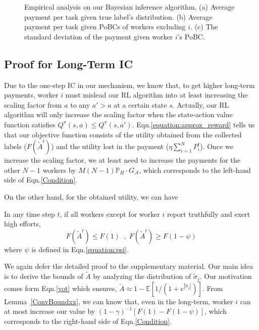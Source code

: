 \begin{figure}[!htb]
\begin{subfigure}[t]{0.32\textwidth}
        \caption{\label{BIM4}}
    \end{subfigure}
    \caption{\label{BIM} Empirical analysis on our Bayesian inference algorithm. (a) Average payment per task given true label's distribution. (b) Average payment per task given PoBCs of workers excluding $i$. (c) The standard deviation of the payment given worker $i$'s PoBC.}
\vspace{-2mm}
\end{figure}
\subsection{Proof for Long-Term IC}
Due to the one-step IC in our mechanism, we know that, to get higher long-term payments, worker $i$ must mislead our RL algorithm into at least increasing the scaling factor from $a$ to any $a'>a$ at a certain state $s$.
Actually, our RL algorithm will only increase the scaling factor when the state-action value function satisfies $Q^{\pi}(s,a)\leq Q^{\pi}(s,a')$.
Eqn.\ref{equation:approx_reward} tells us that our objective function consists of the utility obtained from the collected labels ($F(\tilde{A}^t)$) and the utility lost in the payment ($\eta {\sum}_{i=1}^{N}P^t_i$).
Once we increase the scaling factor, we at least need to increase the payments for the other $N-1$ workers by $M(N-1)\mathbb{P}_H\cdot G_{\mathcal{A}}$, which corresponds to the left-hand side of Eqn.\ref{Condition}.

On the other hand, for the obtained utility, we can have 
\begin{lemma}
\label{ConvBoundxx}
In any time step $t$, if all workers except for worker $i$ report truthfully and exert high efforts,
\begin{equation*}
F(\tilde{A}^t)\leq F(1) \;\;,\; F(\tilde{A}^t)\geq F(1-\psi)
\end{equation*}
where $\psi$ is defined in Eqn.\ref{equation:psi}.
\end{lemma}
We again defer the detailed proof to the supplementary material.
Our main idea is to derive the bounds of $\tilde{A}$ by analyzing the distribution of $\tilde{\sigma}_j$.
Our motivation comes form Eqn.\ref{vot} which ensures, $\tilde{A} \approx 1-\mathbb{E}[1/(1+e^{|\tilde{\sigma}_j|})]$. From Lemma~\ref{ConvBoundxx}, we can know that, even in the long-term, worker $i$ can at most increase our value by $(1-\gamma)^{-1}[F(1)-F(1-\psi)]$, which corresponds to the right-hand side of Eqn.\ref{Condition}.

